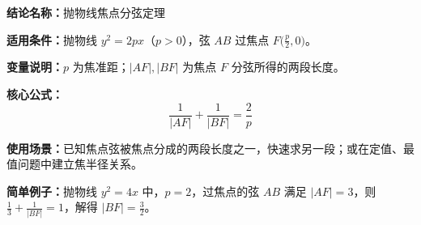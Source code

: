 \textbf{结论名称：}抛物线焦点分弦定理

\textbf{适用条件：}抛物线 \(y^{2}=2px\)（\(p>0\)），弦 \(AB\) 过焦点 \(F\bigl(\frac{p}{2},0\bigr)\)。

\textbf{变量说明：}\(p\) 为焦准距；\(|AF|,|BF|\) 为焦点 \(F\) 分弦所得的两段长度。

\textbf{核心公式：}
\[
\boxed{\frac{1}{|AF|}+\frac{1}{|BF|}=\frac{2}{p}}
\]

\textbf{使用场景：}已知焦点弦被焦点分成的两段长度之一，快速求另一段；或在定值、最值问题中建立焦半径关系。

\textbf{简单例子：}抛物线 \(y^{2}=4x\) 中，\(p=2\)，过焦点的弦 \(AB\) 满足 \(|AF|=3\)，则
\(\frac{1}{3}+\frac{1}{|BF|}=1\)，解得 \(|BF|=\frac{3}{2}\)。